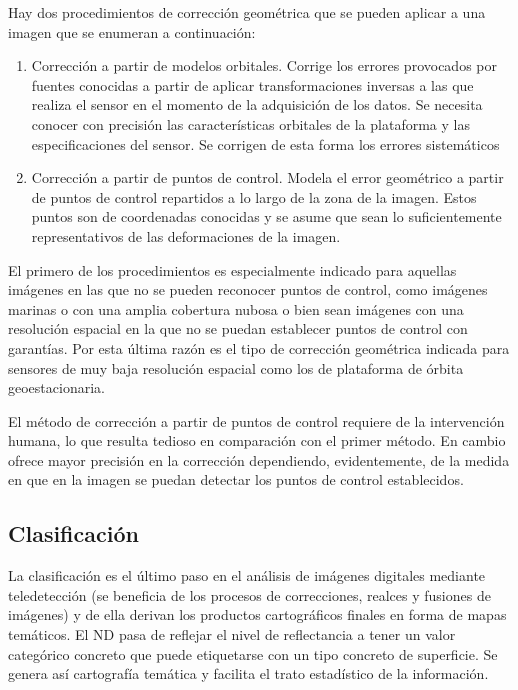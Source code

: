 Hay dos procedimientos de corrección geométrica que se pueden aplicar a una imagen que se enumeran a continuación:

\begin{enumerate}
	\item Corrección a partir de modelos orbitales. Corrige los errores provocados por fuentes conocidas a partir de aplicar transformaciones inversas a las que realiza el sensor en el momento de la adquisición de los datos. Se necesita conocer con precisión las características orbitales de la plataforma y las especificaciones del sensor. Se corrigen de esta forma los errores sistemáticos
	\item Corrección a partir de puntos de control. Modela el error geométrico a partir de puntos de control repartidos a lo largo de la zona de la imagen. Estos puntos son de coordenadas conocidas y se asume que sean lo suficientemente representativos de las deformaciones de la imagen.
\end{enumerate}

El primero de los procedimientos es especialmente indicado para aquellas imágenes en las que no se pueden reconocer puntos de control, como imágenes marinas o con una amplia cobertura nubosa o bien sean imágenes con una resolución espacial en la que no se puedan establecer puntos de control con garantías. Por esta última razón es el tipo de corrección geométrica indicada para sensores de muy baja resolución espacial como los de plataforma de órbita geoestacionaria.\Sep

El método de corrección a partir de puntos de control requiere de la intervención humana, lo que resulta tedioso en comparación con el primer método. En cambio ofrece mayor precisión en la corrección dependiendo, evidentemente, de la medida en que en la imagen se puedan detectar los puntos de control establecidos.\Sep

\subsection{Clasificación}
La clasificación es el último paso en el análisis de imágenes digitales mediante teledetección (se beneficia de los procesos de correcciones, realces y fusiones de imágenes) y de ella derivan los productos cartográficos finales en forma de mapas temáticos. El \ac{ND} pasa de reflejar el nivel de reflectancia a tener un valor categórico concreto que puede etiquetarse con un tipo concreto de superficie. Se genera así cartografía temática y facilita el trato estadístico de la información.\Sep

